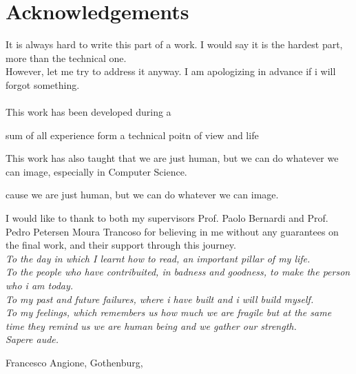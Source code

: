 \thispagestyle{plain_cover}			%
\section*{Acknowledgements}
 
 It is always hard to write this part of a work. I would say it is the hardest part, more than the technical one.\\ 
However, let me try to address it anyway. I am apologizing in advance if i will forgot something.\\\\
 
This work has been developed during a 

sum of all experience form a technical poitn of view and life

This work has also taught that we are just human, but we can do whatever we can image, especially in Computer Science.

cause we are just human, but we can do whatever we can image.

I would like to thank to both my supervisors Prof. Paolo Bernardi and Prof. Pedro Petersen Moura Trancoso for believing in me without any guarantees on the final work, and their support through this journey.\\

\textit{
To the day in which I learnt how to read, an important pillar of my life.\\
To the people who have contribuited, in badness and goodness, to make the person who i am today.\\
To my past and future failures, where i have built and i will build myself.\\
To my feelings, which remembers us how much we are fragile but at the same time they remind us we are human being and we gather our strength.\\
Sapere aude.\\}

\vspace{1.5cm}
\hfill
Francesco Angione, Gothenburg, \monthname \space \the\year

\newpage				%
\thispagestyle{empty}
\mbox{}